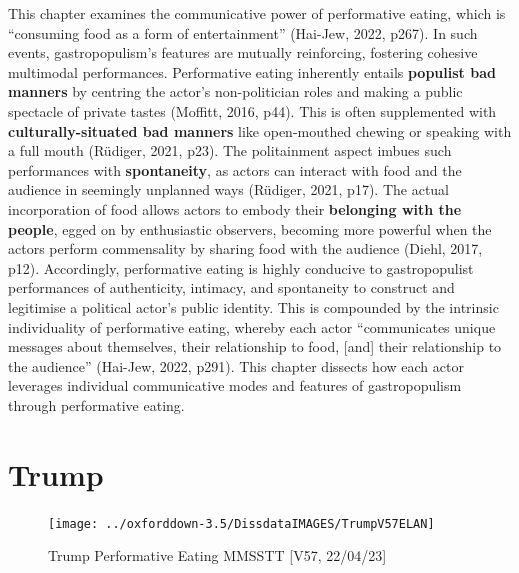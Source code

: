 \documentclass[a4paper, nobind]{templates/ociamthesis}
\begin{document}
This chapter examines the communicative power of performative eating, which is ``consuming food as a form of entertainment'' (Hai-Jew, 2022, p267). In such events, gastropopulism's features are mutually reinforcing, fostering cohesive multimodal performances. Performative eating inherently entails \textbf{populist bad manners} by centring the actor's non-politician roles and making a public spectacle of private tastes (Moffitt, 2016, p44). This is often supplemented with \textbf{culturally-situated bad manners} like open-mouthed chewing or speaking with a full mouth (Rüdiger, 2021, p23). The politainment aspect imbues such performances with \textbf{spontaneity}, as actors can interact with food and the audience in seemingly unplanned ways (Rüdiger, 2021, p17). The actual incorporation of food allows actors to embody their \textbf{belonging with the people}, egged on by enthusiastic observers, becoming more powerful when the actors perform commensality by sharing food with the audience (Diehl, 2017, p12). Accordingly, performative eating is highly conducive to gastropopulist performances of authenticity, intimacy, and spontaneity to construct and legitimise a political actor's public identity. This is compounded by the intrinsic individuality of performative eating, whereby each actor ``communicates unique messages about themselves, their relationship to food, {[}and{]} their relationship to the audience'' (Hai-Jew, 2022, p291). This chapter dissects how each actor leverages individual communicative modes and features of gastropopulism through performative eating.

\hypertarget{trump-4}{%
\section*{Trump}\label{trump-4}}

\begin{figure}
\texttt{[image: ../oxforddown-3.5/DissdataIMAGES/TrumpV57ELAN]} \caption{Trump Performative Eating MMSSTT [V57, 22/04/23]}\label{fig:unnamed-chunk-25}
\end{figure}
\end{document}
